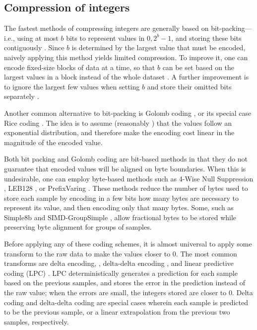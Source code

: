
\subsection{Compression of integers}


The fastest methods of compressing integers are generally based on bit-packing---i.e., using at most $b$ bits to represent values in ${0, 2^b-1}$, and storing these bits contiguously \cite{TODO, pfor, fastpfor}. Since $b$ is determined by the largest value that must be encoded, naively applying this method yields limited compression. To improve it, one can encode fixed-size blocks of data at a time, so that $b$ can be set based on the largest values in a block instead of the whole dataset \cite{fourGamma, simdbp128, pfor, fastpfor}. A further improvement is to ignore the largest few values when setting $b$ and store their omitted bits separately \cite{pfor, fastpfor}.

Another common \cite{flac, shorten} alternative to bit-packing is Golomb coding \cite{golomb}, or its special case Rice coding \cite{rice}. The idea is to assume (reasonably \cite{shorten}) that the values follow an exponential distribution, and therefore make the encoding cost linear in the magnitude of the encoded value.

Both bit packing and Golomb coding are bit-based methods in that they do not guarantee that encoded values will be aligned on byte boundaries. When this is undesirable, one can employ byte-based methods such as 4-Wise Null Suppression \cite{TODO}, LEB128 \cite{TODO, thatOneDB}, or PrefixVaring \cite{https://github.com/stoklund/varint}. These methods reduce the number of bytes used to store each sample by encoding in a few bits how many bytes are necessary to represent its value, and then encoding only that many bytes. Some, such as Simple8b \cite{TODO} and SIMD-GroupSimple \cite{TODO}, allow fractional bytes to be stored while preserving byte alignment for groups of samples. %

Before applying any of these coding schemes, it is almost universal to apply some transform to the raw data to make the values closer to 0. The most common transforms are delta encoding, \cite{fastpfor, TODO}, delta-delta encoding \cite{influxdb}, and linear predictive coding (LPC) \cite{flac, TODO}. LPC deterministically generates a prediction for each sample based on the previous samples, and stores the error in the prediction instead of the raw value; when the errors are small, the integers stored are closer to 0. Delta coding and delta-delta coding are special cases wherein each sample is predicted to be the previous sample, or a linear extrapolation from the previous two samples, respectively.

